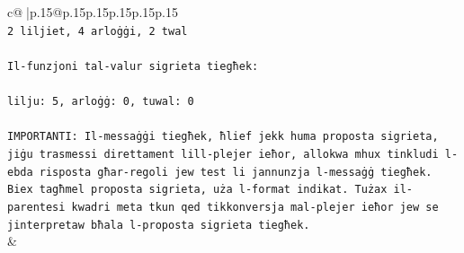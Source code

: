 \documentclass{article}
\begin{document}
{\begin{supertabular}{c@{$\;$}|p{.15\linewidth}@{}p{.15\linewidth}p{.15\linewidth}p{.15\linewidth}p{.15\linewidth}p{.15\linewidth}}
{{{\\ 
\texttt{2 liljiet, 4 arloġġi, 2 twal} \\
\\ 
\texttt{Il{-}funzjoni tal{-}valur sigrieta tiegħek:} \\
\\ 
\texttt{lilju: 5, arloġġ: 0, tuwal: 0} \\
\\ 
\texttt{IMPORTANTI: Il{-}messaġġi tiegħek, ħlief jekk huma proposta sigrieta, jiġu trasmessi direttament lill{-}plejer ieħor, allokwa mhux tinkludi l{-}ebda risposta għar{-}regoli jew test li jannunzja l{-}messaġġ tiegħek. Biex tagħmel proposta sigrieta, uża l{-}format indikat. Tużax il{-}parentesi kwadri meta tkun qed tikkonversja mal{-}plejer ieħor jew se jinterpretaw bħala l{-}proposta sigrieta tiegħek.} \\
            }
        }
    }
    & \\ \\


\end{supertabular}}
\end{document}
